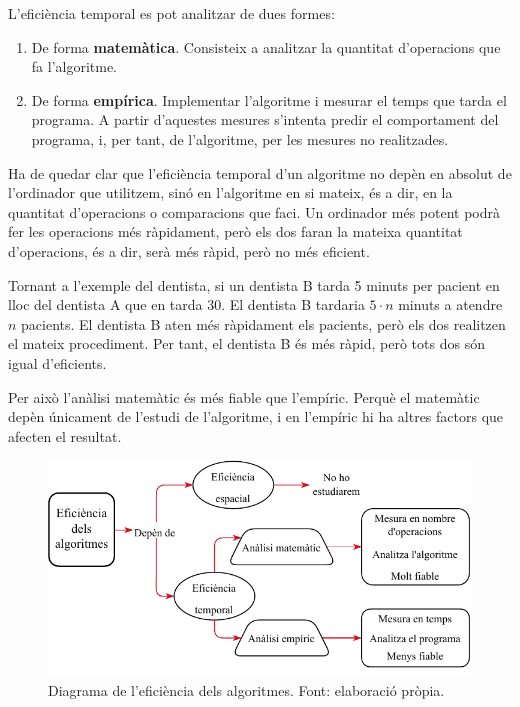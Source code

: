 L'eficiència temporal es pot analitzar de dues formes:
\begin{enumerate}
    \item De forma \textbf{matemàtica}. Consisteix a analitzar la quantitat d'operacions que fa l'algoritme.
    \item De forma \textbf{empírica}. Implementar l'algoritme i mesurar el temps que tarda el programa. A partir d'aquestes mesures s'intenta predir el comportament del programa, i, per tant, de l'algoritme, per les mesures no realitzades.
\end{enumerate}

Ha de quedar clar que l'eficiència temporal d'un algoritme no depèn en absolut de l'ordinador que utilitzem, sinó en l'algoritme en si mateix, és a dir, en la quantitat d'operacions o comparacions que faci. Un ordinador més potent podrà fer les operacions més ràpidament, però els dos faran la mateixa quantitat d'operacions, és a dir, serà més ràpid, però no més eficient.

Tornant a l'exemple del dentista, si un dentista B tarda 5 minuts per pacient en lloc del dentista A que en tarda 30. El dentista B tardaria $5 \cdot n$ minuts a atendre $n$ pacients. El dentista B aten més ràpidament els pacients, però els dos realitzen el mateix procediment. Per tant, el dentista B és més ràpid, però tots dos són igual d'eficients. 

Per això l'anàlisi matemàtic és més fiable que l'empíric. Perquè el matemàtic depèn únicament de l'estudi de l'algoritme, i en l'empíric hi ha altres factors que afecten el resultat.

\begin{figure}[h]
    \centering
    \includegraphics[width=.65\textwidth]{capitols/figures/diagram.drawio (1).pdf}
    \caption[Diagrama de l'eficiència dels algoritmes.]{Diagrama de l'eficiència dels algoritmes. Font: elaboració pròpia.}
    \label{Figura}
\end{figure}


